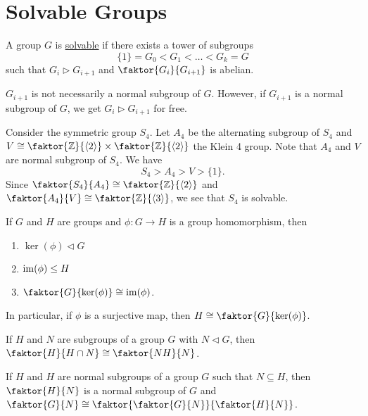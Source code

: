 \documentclass[11pt]{article}
\newcommand{\cyclic}[1]{\left\langle #1 \right\rangle}
\newcommand{\quotient}[2]{\faktor{#1}{#2}}
\begin{document}
\pagebreak
\section{Solvable Groups}
\begin{definition}
A group $G$ is \underline{solvable} if there exists a tower of subgroups
\begin{equation*}
\{1\} = G_0 < G_1 < \dots < G_k = G
\end{equation*}
such that $G_i \triangleright G_{i+1}$ and $\quotient{G_i}{G_{i+1}}$ is abelian.
\end{definition}
\begin{remark}
$G_{i+1}$ is not necessarily a normal subgroup of $G$. However, if $G_{i+1}$ is
a normal subgroup of $G$, we get $G_i \triangleright G_{i+1}$ for free.
\end{remark}
\begin{example}
Consider the symmetric group $S_4$. Let $A_4$ be the alternating subgroup of
$S_4$ and $ V \cong \quotient{\Z}{\cyclic{2}} \times \quotient{\Z}{\cyclic{2}}$
the Klein 4 group. Note that $A_4$ and $V$ are normal subgroup of $S_4$. We have
\begin{equation*}
S_4 > A_4 > V > \{1\}.
\end{equation*}
Since $\quotient{S_4}{A_4} \cong \quotient{\Z}{\cyclic{2}}$ and
$\quotient{A_4}{V} \cong \quotient{\Z}{\cyclic{3}}$, we see that $S_4$ is
solvable.
\end{example}
\begin{theorem*}
If $G$ and $H$ are groups and $\phi: G \to H$ is a group homomorphism, then
\begin{enumerate}
\item $\ker(\phi) \triangleleft G$
\item $\operatorname{im}(\phi) \leq H$
\item $\quotient{G}{\ker(\phi)} \cong \im(\phi)$.
\end{enumerate}
In particular, if $\phi$ is a surjective map, then $H \cong
\quotient{G}{\ker(\phi)}$.
\label{fit}
\end{theorem*}
\begin{theorem*}
If $H$ and $N$ are subgroups of a group $G$ with $N \triangleleft G$, then
$\quotient{H}{H\cap N} \cong \quotient{NH}{N}$.
\label{sit}
\end{theorem*}
\begin{theorem*}
If $H$ and $H$ are normal subgroups of a group $G$ such that $N \subseteq H$,
then $\quotient{H}{N}$ is a normal subgroup of $G$ and $\quotient{G}{N} \cong
\faktor{\quotient{G}{N}}{\quotient{H}{N}}$.
\label{tit}
\end{theorem*}
\end{document}
